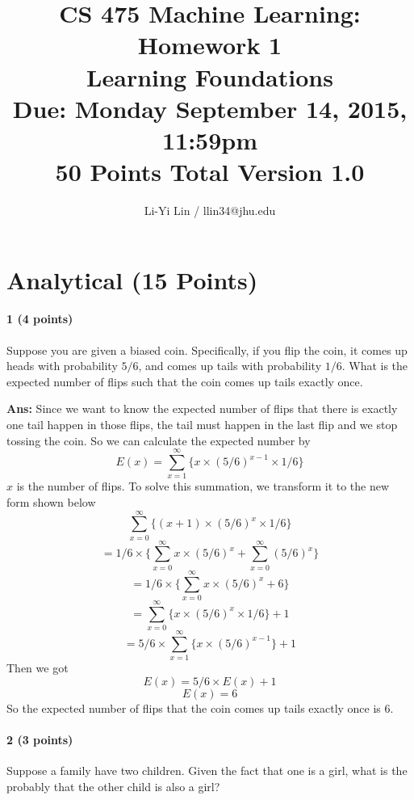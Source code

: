 \documentclass[11pt]{article}
\title{CS 475 Machine Learning: Homework 1\\Learning Foundations\\
\Large{Due: Monday September 14, 2015, 11:59pm}\\
50 Points Total \hspace{1cm} Version 1.0}
\author{Li-Yi Lin / llin34@jhu.edu}
\date{}
\begin{document}
\large
\maketitle
\thispagestyle{headings}

\vspace{-.5in}




\section{Analytical (15 Points)}

\paragraph{1 (4 points)} Suppose you are given a biased coin. Specifically, if you flip the coin, it comes up heads with probability $5/6$, and comes up tails with probability $1/6$.  What is the expected number of flips such that the coin comes up tails exactly once.

\noindent
\textbf{Ans:} 
Since we want to know the expected number of flips that there is exactly one tail happen in those flips, the tail must happen in the last flip and we stop tossing the coin. So we can calculate the expected number by 
$$E(x) = \sum_{x = 1}^{\infty} \{x \times (5/6)^{x-1} \times 1/6\}$$
$x$ is the number of flips.
To solve this summation, we transform it to the new form shown below
$$\sum_{x=0}^{\infty} \{(x + 1) \times (5/6)^{x} \times 1/6\} $$
$$= 1/6 \times \{\sum_{x=0}^{\infty} x \times (5/6)^{x} + \sum_{x=0}^{\infty} (5/6)^{x}\}$$
$$= 1/6 \times \{\sum_{x=0}^{\infty} x \times (5/6)^{x} + 6\}$$
$$= \sum_{x = 0}^{\infty} \{x \times (5/6)^{x} \times 1/6\} + 1$$
$$= 5/6 \times \sum_{x = 1}^{\infty} \{x \times (5/6)^{x-1}\} + 1$$
Then we got
$$E(x) = 5/6 \times E(x) + 1$$
$$E(x) = 6$$
So the expected number of flips that the coin comes up tails exactly once is 6.


\paragraph{2 (3 points)} Suppose a family have two children. Given the fact that one is a girl, what is the probably that the other child is also a girl?
\end{document}
